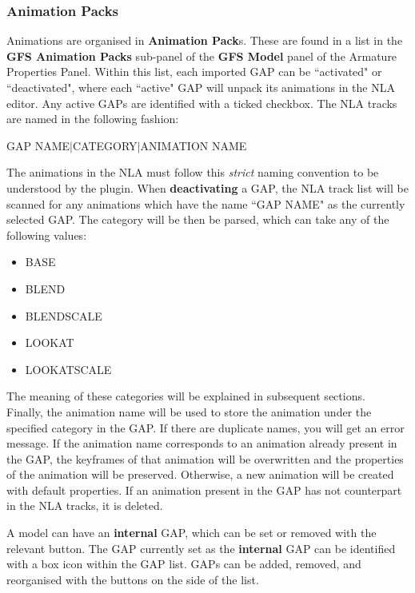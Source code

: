 \documentclass{article}
\begin{document}
\subsubsection{Animation Packs}
\label{SECTION::Edits::Animations::AnimationPacks}
Animations are organised in \textbf{Animation Pack}s. These are found in a list in the \textbf{GFS Animation Packs} sub-panel of the \textbf{GFS Model} panel of the Armature Properties Panel. Within this list, each imported GAP can be ``activated" or ``deactivated", where each ``active" GAP will unpack its animations in the NLA editor. Any active GAPs are identified with a ticked checkbox. The NLA tracks are named in the following fashion:\\
\begin{center}
GAP NAME$\vert$CATEGORY$\vert$ANIMATION NAME
\end{center}
The animations in the NLA must follow this \textit{strict} naming convention to be understood by the plugin. When \textbf{deactivating} a GAP, the NLA track list will be scanned for any animations which have the name ``GAP NAME" as the currently selected GAP. The category will be then be parsed, which can take any of the following values:
\begin{itemize}
\item BASE
\item BLEND
\item BLENDSCALE
\item LOOKAT
\item LOOKATSCALE
\end{itemize}
The meaning of these categories will be explained in subsequent sections.\\
Finally, the animation name will be used to store the animation under the specified category in the GAP. If there are duplicate names, you will get an error message. If the animation name corresponds to an animation already present in the GAP, the keyframes of that animation will be overwritten and the properties of the animation will be preserved. Otherwise, a new animation will be created with default properties. If an animation present in the GAP has not counterpart in the NLA tracks, it is deleted.

A model can have an \textbf{internal} GAP, which can be set or removed with the relevant button. The GAP currently set as the \textbf{internal} GAP can be identified with a box icon within the GAP list. GAPs can be added, removed, and reorganised with the buttons on the side of the list.
\end{document}
